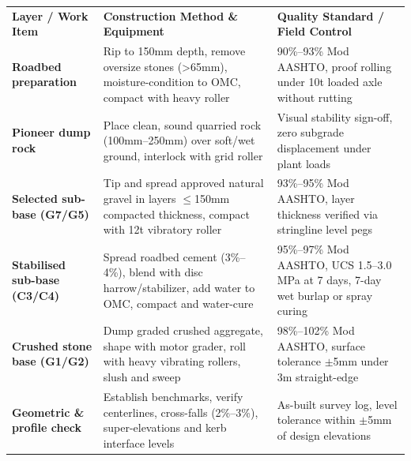 \documentclass[a4paper,11pt]{article}
\begin{document}
{\fontsize{7.7pt}{9.8pt}\selectfont
\renewcommand{\arraystretch}{1.23}
\noindent
\begin{tabularx}{\textwidth}{@{}p{3.3cm} p{6.6cm} X@{}}
\rowcolor{mhnavy}
{\color{white}\bfseries Layer / Work Item} & {\color{white}\bfseries Construction Method \& Equipment} & {\color{white}\bfseries Quality Standard / Field Control} \\
\rowcolor{mhbluelight}
\bfseries Roadbed preparation & Rip to 150mm depth, remove oversize stones (>65mm), moisture-condition to OMC, compact with heavy roller & 90\%--93\% Mod AASHTO, proof rolling under 10t loaded axle without rutting \\
\bfseries Pioneer dump rock & Place clean, sound quarried rock (100mm--250mm) over soft/wet ground, interlock with grid roller & Visual stability sign-off, zero subgrade displacement under plant loads \\
\rowcolor{mhbluelight}
\bfseries Selected sub-base (G7/G5) & Tip and spread approved natural gravel in layers $\le$150mm compacted thickness, compact with 12t vibratory roller & 93\%--95\% Mod AASHTO, layer thickness verified via stringline level pegs \\
\bfseries Stabilised sub-base (C3/C4) & Spread roadbed cement (3\%--4\%), blend with disc harrow/stabilizer, add water to OMC, compact and water-cure & 95\%--97\% Mod AASHTO, UCS 1.5--3.0 MPa at 7 days, 7-day wet burlap or spray curing \\
\rowcolor{mhbluelight}
\bfseries Crushed stone base (G1/G2) & Dump graded crushed aggregate, shape with motor grader, roll with heavy vibrating rollers, slush and sweep & 98\%--102\% Mod AASHTO, surface tolerance $\pm$5mm under 3m straight-edge \\
\bfseries Geometric \& profile check & Establish benchmarks, verify centerlines, cross-falls (2\%--3\%), super-elevations and kerb interface levels & As-built survey log, level tolerance within $\pm$5mm of design elevations \\
\end{tabularx}
\renewcommand{\arraystretch}{1}
}

\vfill
\end{document}
